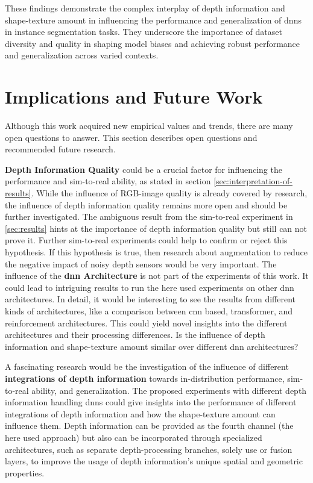 		These findings demonstrate the complex interplay of depth information and shape-texture amount in influencing the performance and generalization of \ac{dnn}s in instance segmentation tasks. They underscore the importance of dataset diversity and quality in shaping model biases and achieving robust performance and generalization across varied contexts.
	
	
	\section{Implications and Future Work}
	\label{sec:implications-and-future-work}
		Although this work acquired new empirical values and trends, there are many open questions to answer. This section describes open questions and recommended future research.
		
		\textbf{Depth Information Quality} could be a crucial factor for influencing the performance and sim-to-real ability, as stated in section \ref{sec:interpretation-of-results}. While the influence of RGB-image quality is already covered by research, the influence of depth information quality remains more open and should be further investigated. The ambiguous result from the sim-to-real experiment in \ref{sec:results} hints at the importance of depth information quality but still can not prove it. Further sim-to-real experiments could help to confirm or reject this hypothesis. If this hypothesis is true, then research about augmentation to reduce the negative impact of noisy depth sensors would be very important.
		\clearpage
		The influence of the \textbf{\ac{dnn} Architecture} is not part of the experiments of this work. It could lead to intriguing results to run the here used experiments on other \ac{dnn} architectures. In detail, it would be interesting to see the results from different kinds of architectures, like a comparison between \ac{cnn} based, transformer, and reinforcement architectures. This could yield novel insights into the different architectures and their processing differences. Is the influence of depth information and shape-texture amount similar over different \ac{dnn} architectures?
		
		A fascinating research would be the investigation of the influence of different \textbf{integrations of depth information} towards in-distribution performance, sim-to-real ability, and generalization. The proposed experiments with different depth information handling \ac{dnn}s could give insights into the performance of different integrations of depth information and how the shape-texture amount can influence them. Depth information can be provided as the fourth channel (the here used approach) but also can be incorporated through specialized architectures, such as separate depth-processing branches, solely use or fusion layers, to improve the usage of depth information's unique spatial and geometric properties.
		

